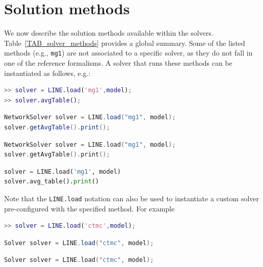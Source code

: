 \section{Solution methods}
We now describe the solution methods available within the  solvers. Table~\ref{TAB_solver_methods} provides a global summary. Some of the listed methods (e.g., \texttt{mg1}) are not associated to a specific solver, as they do not fall in one of the reference formalisms. A solver that runs these methods can be instantiated as follows, e.g.:
\begin{MATLAB}
\begin{lstlisting}[language = matlab]
>> solver = LINE.load('mg1',model);
>> solver.avgTable();
\end{lstlisting}
\end{MATLAB}
\begin{JAVA}
    \begin{lstlisting}[language=java, basicstyle=\ttfamily\scriptsize]
NetworkSolver solver = LINE.load("mg1", model);
solver.getAvgTable().print();
\end{lstlisting}
\end{JAVA}
\begin{KOTLIN}
    \begin{lstlisting}[language=kotlin, basicstyle=\ttfamily\scriptsize]
NetworkSolver solver = LINE.load("mg1", model);
solver.getAvgTable().print();
\end{lstlisting}
\end{KOTLIN}
\begin{PYTHON}
\begin{lstlisting}[language=python]
solver = LINE.load('mg1', model)
solver.avg_table().print()
\end{lstlisting}
\end{PYTHON}
Note that the \texttt{LINE.load} notation can also be used to instantiate a custom solver pre-configured with the specified method. For example
\begin{MATLAB}
\begin{lstlisting}[language = matlab]
>> solver = LINE.load('ctmc',model);
\end{lstlisting}
\end{MATLAB}
\begin{JAVA}
\begin{lstlisting}[language=java, basicstyle=\ttfamily\scriptsize]
Solver solver = LINE.load("ctmc", model);
\end{lstlisting}
\end{JAVA}
\begin{KOTLIN}
\begin{lstlisting}[language=kotlin, basicstyle=\ttfamily\scriptsize]
Solver solver = LINE.load("ctmc", model);
\end{lstlisting}
\end{KOTLIN}
